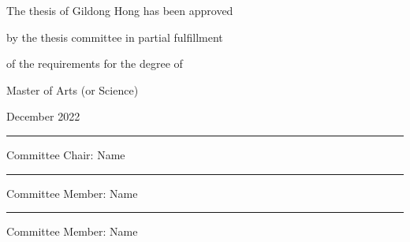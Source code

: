 \documentclass[11pt]{report}
\begin{document}
\newpage %
\begin{center}
\Large
The thesis of Gildong Hong has been approved \par
by the thesis committee in partial fulfillment\par
of the requirements for the degree of \par
Master of Arts (or Science)  
\par\vspace{1cm}
\large December 2022 %
\par\vspace{3cm}
\rule{.6\textwidth}{0.4pt}\par %
\Large
Committee Chair: Name
\par\vspace{1cm}
\rule{.6\textwidth}{0.4pt}\par %
Committee Member: Name
\par\vspace{1cm}
\rule{.6\textwidth}{0.4pt}\par %
Committee Member: Name 
\end{center}


\end{document}
